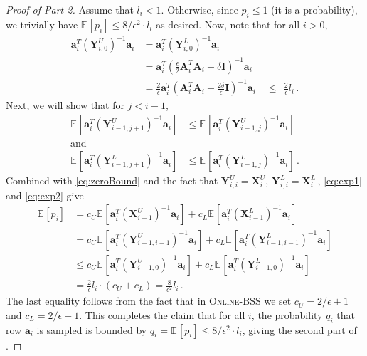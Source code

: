 \documentclass{toc}
\newcommand{\bv}[1]{\mathbf{#1}}
\newcommand{\expct}[3]{\mathbb{E}_{{#1}_{#2}}\left[#3\right]}
\begin{document}
\begin{proof}[Proof of  Part 2]
Assume that  $l_i < 1$. Otherwise, since $p_i \le 1$ (it is a probability), we trivially have $\expct{}{}{p_i} \le 8/{\epsilon^2}\cdot  l_i$ as desired.  Now, note that for all $i > 0$, %
\begin{align}\label{eq:zeroBound}
\bv{a}_i^T (\bv{Y}^U_{i,0})^{-1} \bv{a}_i &= \bv{a}_i^T (\bv{Y}^L_{i,0})^{-1} \bv{a}_i \nonumber\\
&= \bv{a}_i^T \left ( \frac{\epsilon}{2} \bv{A}_i^T \bv{A}_i + \delta \bv I \right )^{-1} \bv{a}_i \nonumber\\
&= \frac{2}{\epsilon} \bv{a}_i^T \left ( \bv{A}_i^T \bv{A}_i + \frac{2 \delta}{\epsilon} \bv I \right )^{-1} \bv{a}_i
%
 \quad \le \ \ \frac{2}{\epsilon} l_i\,.    %
\end{align}
Next, we will show that for $j < i-1$,
\begin{align}
\expct{}{}{\bv{a}_i^T (\bv{Y}^U_{i-1,j+1})^{-1} \bv{a}_i} &\leq \expct{}{}{\bv{a}_i^T (\bv{Y}^U_{i-1,j})^{-1} \bv{a}_i} \label{eq:exp1}\\
\text{and}\nonumber \\
\expct{}{}{\bv{a}_i^T (\bv{Y}^L_{i-1,j+1})^{-1} \bv{a}_i} &\leq \expct{}{}{\bv{a}_i^T (\bv{Y}^L_{i-1,j})^{-1} \bv{a}_i}\,. \label{eq:exp2}
\end{align}
Combined with \eqref{eq:zeroBound} and the fact that $\bv{Y}^U_{i,i} = \bv{X}^U_i$, $\bv{Y}^L_{i,i} = \bv{X}^L_i$\,, \eqref{eq:exp1} and \eqref{eq:exp2} give
\begin{align*}
\expct{}{}{p_i} &= c_U \expct{}{}{\bv{a}_i^T (\bv{X}^U_{i-1})^{-1} \bv{a}_i} + c_L \expct{}{}{\bv{a}_i^T (\bv{X}^L_{i-1})^{-1} \bv{a}_i} \\
&= c_U \expct{}{}{\bv{a}_i^T (\bv{Y}^U_{i-1,i-1})^{-1} \bv{a}_i} + c_L \expct{}{}{\bv{a}_i^T (\bv{Y}^L_{i-1,i-1})^{-1} \bv{a}_i} \\
&\leq c_U \expct{}{}{\bv{a}_i^T (\bv{Y}^U_{i-1,0})^{-1} \bv{a}_i} + c_L \expct{}{}{\bv{a}_i^T (\bv{Y}^L_{i-1,0})^{-1} \bv{a}_i} \\
&= \frac{2}{\epsilon} l_i  \cdot (c_U + c_L) = \frac{8}{\epsilon^2} l_i\,.
\end{align*}
The last equality follows from the fact that in \textsc{Online-BSS}  we set  $c_U = 2/\epsilon+1$ and $c_L = 2/\epsilon-1$. This completes the claim that for all $i$, the probability $q_i$ that row $\bv{a}_i$ is sampled is bounded by $q_i = \expct{}{}{p_i} \le 8/\epsilon^2 \cdot l_i$, giving the second part of .


\end{proof}
\end{document}
